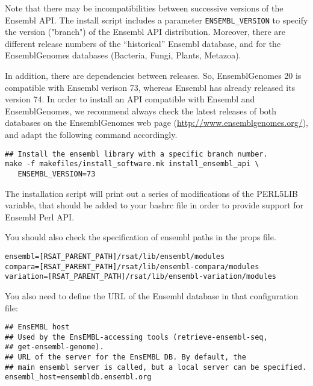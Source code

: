 \documentclass[12pt,a4paper, oneside]{scrreprt} %
\begin{document}
Note that there may be incompatibilities between successive versions
of the Ensembl API. The install script includes a parameter
\texttt{ENSEMBL\_VERSION} to specify the version ("branch") of the
Ensembl API distribution.  Moreover, there are different release
numbers of the ``historical'' Ensembl database, and for the
EnsemblGenomes databases (Bacteria, Fungi, Plants, Metazoa).

In addition, there are dependencies between releases. So,
EnsemblGenomes 20 is compatible with Ensembl verison 73, whereas
Ensembl has already released its version 74. In order to install an
API compatible with Ensembl and EnsemblGenomes, we recommend always
check the latest releases of both databases on the EnsemblGenomes web
page (\url{http://www.ensemblgenomes.org/}), and adapt the following
command accordingly.

\begin{lstlisting}
## Install the ensembl library with a specific branch number.
make -f makefiles/install_software.mk install_ensembl_api \
   ENSEMBL_VERSION=73
\end{lstlisting}

The installation script will print out a series of modifications of
the PERL5LIB variable, that should be added to your bashrc file in
order to provide support for Ensembl Perl API.

You should also check the specification of ensembl paths in the props
file.

\begin{lstlisting}
ensembl=[RSAT_PARENT_PATH]/rsat/lib/ensembl/modules
compara=[RSAT_PARENT_PATH]/rsat/lib/ensembl-compara/modules
variation=[RSAT_PARENT_PATH]/rsat/lib/ensembl-variation/modules
\end{lstlisting}

You also need to define the URL of the Ensembl database in that
configuration file:

\begin{lstlisting}
## EnsEMBL host
## Used by the EnsEMBL-accessing tools (retrieve-ensembl-seq,
## get-ensembl-genome).
## URL of the server for the EnsEMBL DB. By default, the
## main ensembl server is called, but a local server can be specified.
ensembl_host=ensembldb.ensembl.org
\end{lstlisting}

\end{document}
